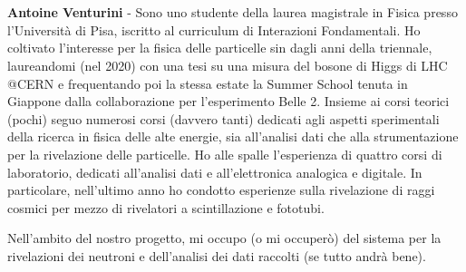 \documentclass{article}
\begin{document}
\section*{}
\textbf{Antoine Venturini} - Sono uno studente della laurea magistrale in Fisica presso l'Università di Pisa, iscritto al curriculum di Interazioni Fondamentali. Ho coltivato l'interesse per la fisica delle particelle sin dagli anni della triennale, laureandomi (nel 2020) con una tesi su una misura del bosone di Higgs di LHC @CERN e frequentando poi la stessa estate la Summer School tenuta in Giappone dalla collaborazione per l'esperimento Belle 2.  
Insieme ai corsi teorici (pochi) seguo numerosi corsi (davvero tanti) dedicati agli aspetti sperimentali della ricerca in fisica delle alte energie, sia all'analisi dati che alla strumentazione per la rivelazione delle particelle.
Ho alle spalle l'esperienza di quattro corsi di laboratorio, dedicati all'analisi dati e all'elettronica analogica e digitale. In particolare, nell'ultimo anno ho condotto esperienze sulla rivelazione di raggi cosmici per mezzo di rivelatori a scintillazione e fototubi. 

Nell'ambito del nostro progetto, mi occupo (o mi occuperò) del sistema per la rivelazioni dei neutroni e dell'analisi dei dati raccolti (se tutto andrà bene). 
\end{document}
